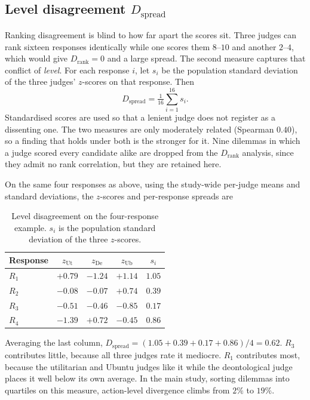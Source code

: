 \documentclass[10pt,twocolumn,a4paper]{article}
\begin{document}
\subsection{Level disagreement \texorpdfstring{$D_{\text{spread}}$}{D-spread}}

Ranking disagreement is blind to how far apart the scores sit. Three
judges can rank sixteen responses identically while one scores them
$8$--$10$ and another $2$--$4$, which would give \(D_{\text{rank}} = 0\)
and a large spread. The second measure captures that conflict of
\emph{level}. For each response \(i\), let \(s_i\) be the population
standard deviation of the three judges' \(z\)-scores on that response.
Then
%
\[
D_{\text{spread}} = \tfrac{1}{16}\sum_{i=1}^{16} s_i .
\]
%
Standardised scores are used so that a lenient judge does not register
as a dissenting one. The two measures are only moderately related
(Spearman \(0.40\)), so a finding that holds under both is the stronger
for it. Nine dilemmas in which a judge scored every candidate alike are
dropped from the \(D_{\text{rank}}\) analysis, since they admit no rank
correlation, but they are retained here.

On the same four responses as above, using the study-wide per-judge
means and standard deviations, the \(z\)-scores and per-response
spreads are

\begin{table}[H]
\centering
\small
\caption{Level disagreement on the four-response example.
\(s_i\) is the population standard deviation of the three \(z\)-scores.}
\label{tab:dspread-example}
\vspace{2pt}
\begin{tabular}{@{}l ccc c@{}}
\toprule
\textbf{Response} & \(z_{\text{Ut}}\) & \(z_{\text{De}}\) & \(z_{\text{Ub}}\) & \(s_i\) \\
\midrule
\(R_1\) & \(+0.79\) & \(-1.24\) & \(+1.14\) & \(1.05\) \\
\(R_2\) & \(-0.08\) & \(-0.07\) & \(+0.74\) & \(0.39\) \\
\(R_3\) & \(-0.51\) & \(-0.46\) & \(-0.85\) & \(0.17\) \\
\(R_4\) & \(-1.39\) & \(+0.72\) & \(-0.45\) & \(0.86\) \\
\bottomrule
\end{tabular}
\end{table}

Averaging the last column,
\(D_{\text{spread}} = (1.05 + 0.39 + 0.17 + 0.86)/4 = 0.62\).
\(R_3\) contributes little, because all three judges rate it mediocre.
\(R_1\) contributes most, because the utilitarian and Ubuntu judges
like it while the deontological judge places it well below its own
average. In the main study, sorting dilemmas into quartiles on this
measure, action-level divergence climbs from \(2\%\) to \(19\%\).
\end{document}
